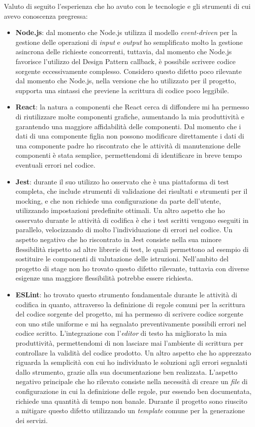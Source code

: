 Valuto di seguito l'esperienza che ho avuto con le tecnologie e gli strumenti di cui avevo conoscenza pregressa:
\begin{itemize}
  \item \textbf{Node.js}: dal momento che Node.js utilizza il modello \emph{event-driven} per la gestione delle operazioni di \emph{input} e \emph{output} ho semplificato molto la gestione asincrona delle richieste concorrenti, tuttavia, dal momento che Node.js favorisce l'utilizzo del Design Pattern \gls{callback}, è possibile scrivere codice sorgente eccessivamente complesso. Considero questo difetto poco rilevante dal momento che Node.js, nella versione che ho utilizzato per il progetto, supporta una sintassi che previene la scrittura di codice poco leggibile.
  \item \textbf{React}: la natura a componenti che React cerca di diffondere mi ha permesso di riutilizzare molte componenti grafiche, aumentando la mia  produttività e garantendo una maggiore affidabilità delle componenti. Dal momento che i dati di una componente figlia non possono modificare direttamente i dati di una componente padre ho riscontrato che le attività di manutenzione delle componenti è stata semplice, permettendomi di identificare in breve tempo eventuali errori nel codice.
  \item \textbf{Jest}: durante il suo utilizzo ho osservato che è una piattaforma di test completa, che include strumenti di validazione dei risultati e strumenti per il \gls{mocking}, e che non richiede una configurazione da parte dell'utente, utilizzando impostazioni predefinite ottimali. Un altro aspetto che ho osservato durante le attività di codifica è che i test scritti vengono eseguiti in parallelo, velocizzando di molto l'individuazione di errori nel codice. Un aspetto negativo che ho riscontrato in Jest consiste nella sua minore flessibilità rispetto ad altre librerie di test, le quali permettono ad esempio di sostituire le componenti di valutazione delle istruzioni. Nell'ambito del progetto di stage non ho trovato questo difetto rilevante, tuttavia con diverse esigenze una maggiore flessibilità potrebbe essere richiesta.   
  \item \textbf{ESLint}: ho trovato questo strumento fondamentale durante le attività di codifica in quanto, attraverso la definizione di regole comuni per la scrittura del codice sorgente del progetto, mi ha permesso di scrivere codice sorgente con uno stile uniforme e mi ha segnalato preventivamente possibili errori nel codice scritto. L'integrazione con l'\emph{editor} di testo ha migliorato la mia produttività, permettendomi di non lasciare mai l'ambiente di scrittura per controllare la validità del codice prodotto. Un altro aspetto che ho apprezzato riguarda la semplicità con cui ho individuato le soluzioni agli errori segnalati dallo strumento, grazie alla sua documentazione ben realizzata. L'aspetto negativo principale che ho rilevato consiste nella necessità di creare un \emph{file} di configurazione in cui la definizione delle regole, pur essendo ben documentata, richiede una quantità di tempo non banale. Durante il progetto sono riuscito a mitigare questo difetto utilizzando un \emph{template} comune per la generazione dei servizi. 

\end{itemize}
